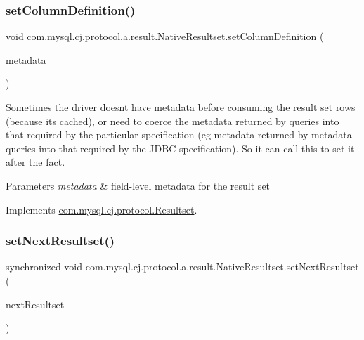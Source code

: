 \subsubsection{\texorpdfstring{set\+Column\+Definition()}{setColumnDefinition()}}
{\footnotesize\ttfamily void com.\+mysql.\+cj.\+protocol.\+a.\+result.\+Native\+Resultset.\+set\+Column\+Definition (\begin{DoxyParamCaption}\item[{\mbox{\hyperlink{interfacecom_1_1mysql_1_1cj_1_1protocol_1_1_column_definition}{Column\+Definition}}}]{metadata }\end{DoxyParamCaption})}

Sometimes the driver doesn\textquotesingle{}t have metadata before consuming the result set rows (because it\textquotesingle{}s cached), or need to coerce the metadata returned by queries into that required by the particular specification (eg metadata returned by metadata queries into that required by the J\+D\+BC specification). So it can call this to set it after the fact.


\begin{DoxyParams}{Parameters}
{\em metadata} & field-\/level metadata for the result set \\
\hline
\end{DoxyParams}


Implements \mbox{\hyperlink{interfacecom_1_1mysql_1_1cj_1_1protocol_1_1_resultset_aee8797446404a63565e56825f2b5a5d4}{com.\+mysql.\+cj.\+protocol.\+Resultset}}.

\mbox{\label{classcom_1_1mysql_1_1cj_1_1protocol_1_1a_1_1result_1_1_native_resultset_a69d6943f5f8f3e38a159e89897c583b2}} 
\subsubsection{\texorpdfstring{set\+Next\+Resultset()}{setNextResultset()}}
{\footnotesize\ttfamily synchronized void com.\+mysql.\+cj.\+protocol.\+a.\+result.\+Native\+Resultset.\+set\+Next\+Resultset (\begin{DoxyParamCaption}\item[{\mbox{\hyperlink{interfacecom_1_1mysql_1_1cj_1_1protocol_1_1_resultset}{Resultset}}}]{next\+Resultset }\end{DoxyParamCaption})}


